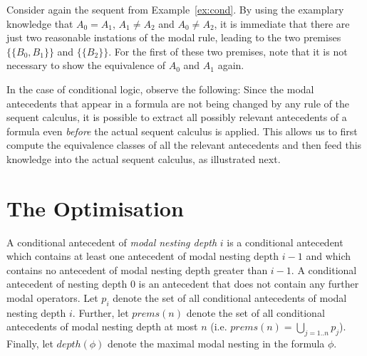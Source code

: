 \documentclass{entcs} \usepackage{entcsmacro}
\newcommand{\prems}{\mathit{prems}}
\begin{document}
\begin{example}
Consider again the sequent from Example~\ref{ex:cond}. By using the examplary
knowledge that $A_0=A_1$, $A_1\neq A_2$ and $A_0\neq A_2$, it is immediate
that there are just two reasonable instations of the modal rule, leading
to the two premises $\{\{B_0,B_1\}\}$ and $\{\{B_2\}\}$. For the
first of these two premises, note that it is not necessary to show the
equivalence of $A_0$ and $A_1$ again.
\end{example}


\noindent In the case of conditional logic, observe the following:
Since the modal antecedents that appear in a formula are not being
changed by any rule of the sequent calculus, it is possible to extract
all possibly relevant antecedents of a formula even \emph{before} the
actual sequent calculus is applied. This allows us to first compute
the equivalence classes of all the relevant antecedents and then feed
this knowledge into the actual sequent calculus, as illustrated next.

\section{The Optimisation}

\begin{definition}
A conditional antecedent of \emph{modal nesting depth} $i$ is a
conditional antecedent which contains at least one antecedent of
modal nesting depth $i-1$ and which contains no antecedent 
of modal nesting depth greater than $i-1$. A
conditional antecedent of nesting depth 0 is an antecedent
that does not contain any further modal operators.
Let $p_i$ denote the set of all conditional antecedents of modal
nesting depth $i$. Further, let $\prems(n)$ denote the set of all
conditional antecedents of modal nesting depth at most $n$ (i.e.
$\prems(n)=\bigcup_{j=1..n}^{} p_j$).
Finally, let $depth(\phi)$ denote the maximal modal nesting in
the formula $\phi$.
\end{definition}

\end{document}
